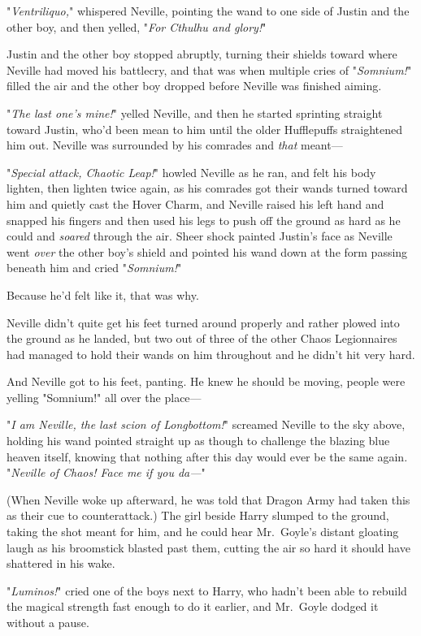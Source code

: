"\emph{Ventriliquo,}" whispered Neville, pointing the wand to one side of
Justin and the other boy, and then yelled, "\emph{For Cthulhu and glory!}"

Justin and the other boy stopped abruptly, turning their shields toward where
Neville had moved his battlecry, and that was when multiple cries of
"\emph{Somnium!}" filled the air and the other boy dropped before Neville was
finished aiming.

"\emph{The last one's mine!}" yelled Neville, and then he started sprinting
straight toward Justin, who'd been mean to him until the older Hufflepuffs
straightened him out. Neville was surrounded by his comrades and \emph{that}
meant---

"\emph{Special attack, Chaotic Leap!}" howled Neville as he ran, and felt his
body lighten, then lighten twice again, as his comrades got their wands turned
toward him and quietly cast the Hover Charm, and Neville raised his left hand
and snapped his fingers and then used his legs to push off the ground as hard
as he could and \emph{soared} through the air. Sheer shock painted Justin's
face as Neville went \emph{over} the other boy's shield and pointed his wand
down at the form passing beneath him and cried "\emph{Somnium!}"

Because he'd felt like it, that was why.

Neville didn't quite get his feet turned around properly and rather plowed into
the ground as he landed, but two out of three of the other Chaos Legionnaires
had managed to hold their wands on him throughout and he didn't hit very hard.

And Neville got to his feet, panting. He knew he should be moving, people were
yelling "Somnium!" all over the place---

"\emph{I am Neville, the last scion of Longbottom!}" screamed Neville to the
sky above, holding his wand pointed straight up as though to challenge the
blazing blue heaven itself, knowing that nothing after this day would ever be
the same again. "\emph{Neville of Chaos! Face me if you da---}"

(When Neville woke up afterward, he was told that Dragon Army had taken this as
their cue to counterattack.)
\sbreak
The girl beside Harry slumped to the ground, taking the shot meant for him, and
he could hear Mr.~Goyle's distant gloating laugh as his broomstick blasted past
them, cutting the air so hard it should have shattered in his wake.

"\emph{Luminos!}" cried one of the boys next to Harry, who hadn't been able to
rebuild the magical strength fast enough to do it earlier, and Mr.~Goyle dodged
it without a pause.

